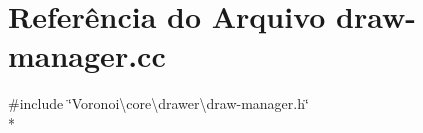 \section{Referência do Arquivo draw-\/manager.cc}
\label{draw-manager_8cc}
{\ttfamily \#include \char`\"{}Voronoi\textbackslash{}core\textbackslash{}drawer\textbackslash{}draw-\/manager.\+h\char`\"{}}\\*
